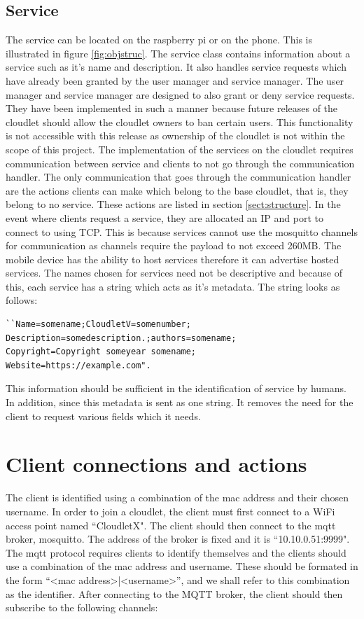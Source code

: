 \subsection{Service}
The service can be located on the raspberry pi or on the phone. This is illustrated in figure \ref{fig:objstruc}. The service class contains information about a service such as it's name and description. It also handles service requests which have already been granted by the user manager and service manager. The user manager and service manager are designed to also grant or deny service requests. They have been implemented in such a manner because future releases of the cloudlet should allow the cloudlet owners to ban certain users. This functionality is not accessible with this release as ownership of the cloudlet is not within the scope of this project. The implementation of the services on the cloudlet requires communication between service and clients to not go through the communication handler. The only communication that goes through the communication handler are the actions clients can make which belong to the base cloudlet, that is, they belong to no service. These actions are listed in section \ref{sect:structure}. In the event where clients request a service, they are allocated an IP and port to connect to using TCP. This is because services cannot use the mosquitto channels for communication as channels require the payload to not exceed 260MB. The mobile device has the ability to host services therefore it can advertise hosted services. The names chosen for services need not be descriptive and because of this, each
service has a string which acts as it's metadata. The string looks as follows:

\begin{lstlisting}
``Name=somename;CloudletV=somenumber;
Description=somedescription.;authors=somename;
Copyright=Copyright someyear somename;
Website=https://example.com".
\end{lstlisting}

\noindent This information should be sufficient in the identification of service by humans. In addition, since this metadata is sent as one string. It removes the need for the client to request various fields which it needs.

\section{Client connections and actions}
The client is identified using a combination of the mac address and their chosen username. In order to join a cloudlet, the client must first connect to a WiFi access point named ``CloudletX". The client should then connect to the mqtt broker, mosquitto. The address of the broker is fixed and it is ``10.10.0.51:9999". The mqtt protocol requires clients to identify themselves and the clients should use a combination of the mac address and username. These should be formated in the form “<mac address>|<username>”, and we shall refer to this combination as the identifier. After connecting to the MQTT broker, the client should then subscribe to the following channels:

